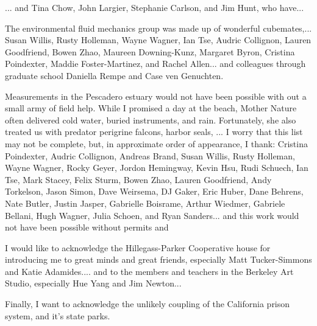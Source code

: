 \documentclass{ucbthesis}
\begin{document}
\begin{frontmatter}



\tableofcontents
\clearpage
\listoffigures
\clearpage
\listoftables

\begin{acknowledgements}


... and Tina Chow, John Largier, Stephanie Carlson, and Jim Hunt, who have... 

The environmental fluid mechanics group was made up of wonderful cubemates,... Susan Willis, Rusty Holleman, Wayne Wagner, Ian Tse, Audric Collignon, Lauren Goodfriend, Bowen Zhao, Maureen Downing-Kunz, Margaret Byron, Cristina Poindexter, Maddie Foster-Martinez, and Rachel Allen... and colleagues through graduate school Daniella Rempe and Case ven Genuchten. 

Measurements in the Pescadero estuary would not have been possible with out a small army of field help. While I promised a day at the beach, Mother Nature often delivered cold water, buried instruments, and rain. Fortunately, she also treated us with predator perigrine falcons, harbor seals, ... I worry that this list may not be complete, but, in approximate order of appearance, I thank: Cristina Poindexter, Audric Collignon, Andreas Brand, Susan Willis, Rusty Holleman, Wayne Wagner, Rocky Geyer, Jordon Hemingway, Kevin Hsu, Rudi Schuech, Ian Tse, Mark Stacey, Felix Sturm, Bowen Zhao, Lauren Goodfriend, Andy Torkelson, Jason Simon, Dave Weirsema, DJ Gaker, Eric Huber, Dane Behrens, Nate Butler, Justin Jasper, Gabrielle Boisrame, Arthur Wiedmer, Gabriele Bellani, Hugh Wagner, Julia Schoen, and Ryan Sanders... and this work would not have been possible without permits and 

I would like to acknowledge the Hillegass-Parker Cooperative house for introducing me to great minds and great friends, especially Matt Tucker-Simmons and Katie Adamides.... and to the members and teachers in the Berkeley Art Studio, especially Hue Yang and Jim Newton...


Finally, I want to acknowledge the unlikely coupling of the California prison system, and it's state parks. 
\end{acknowledgements}

\end{frontmatter}
\end{document}
